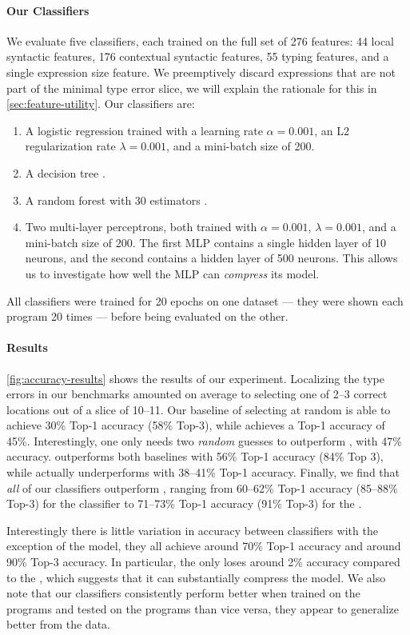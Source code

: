 \paragraph{Our Classifiers}
We evaluate five classifiers, each trained on the full set of 276
features: 44 local syntactic features, 176 contextual syntactic
features, 55 typing features, and a single expression size feature.
%
%
We preemptively discard expressions that are not part of the minimal
type error slice, we will explain the rationale for this in
\autoref{sec:feature-utility}.
%
Our classifiers are:
%
\begin{enumerate}
\item A logistic regression trained with a learning rate
  $\alpha = 0.001$, an L2 regularization rate $\lambda = 0.001$, and a
  mini-batch size of 200.
\item A decision tree .
\item A random forest with 30 estimators .
\item Two multi-layer perceptrons, both trained with $\alpha = 0.001$,
  $\lambda = 0.001$, and a mini-batch size of 200. The first MLP
  contains a single hidden layer of 10 neurons, and the second contains
  a hidden layer of 500 neurons. This allows us to investigate how well
  the MLP can \emph{compress} its model.
\end{enumerate}
%
All classifiers were trained for 20 epochs on one dataset
--- \ie they were shown each program 20 times ---
before being evaluated on the other.



\paragraph{Results}
\autoref{fig:accuracy-results} shows the results of our experiment.
%
Localizing the type errors in our benchmarks amounted on average to
selecting one of 2--3 correct locations out of a slice of 10--11.
%
Our baseline of selecting at random is able to achieve 30\% Top-1
accuracy (58\% Top-3), while \ocaml achieves a Top-1 accuracy of 45\%.
%
Interestingly, one only needs two \emph{random} guesses to outperform
\ocaml, with 47\% accuracy.
%
\sherrloc outperforms both baselines with 56\% Top-1 accuracy (84\% Top
3), while \mycroft actually underperforms \ocaml with 38--41\% Top-1
accuracy.
%
Finally, we find that \emph{all} of our classifiers outperform \sherrloc,
ranging from 60--62\% Top-1 accuracy (85--88\% Top-3) for the \linear
classifier to 71--73\% Top-1 accuracy (91\% Top-3) for the \hiddenFH.

Interestingly there is little variation in accuracy between classifiers
with the exception of the \linear model, they all achieve around 70\%
Top-1 accuracy and around 90\% Top-3 accuracy.
%
In particular, the \hiddenT only loses around 2\% accuracy compared to
the \hiddenFH, which suggests that it can substantially compress the
model.
%
We also note that our classifiers consistently perform better when
trained on the \FALL programs and tested on the \SPRING programs than
vice versa, they appear to generalize better from the \FALL data.
